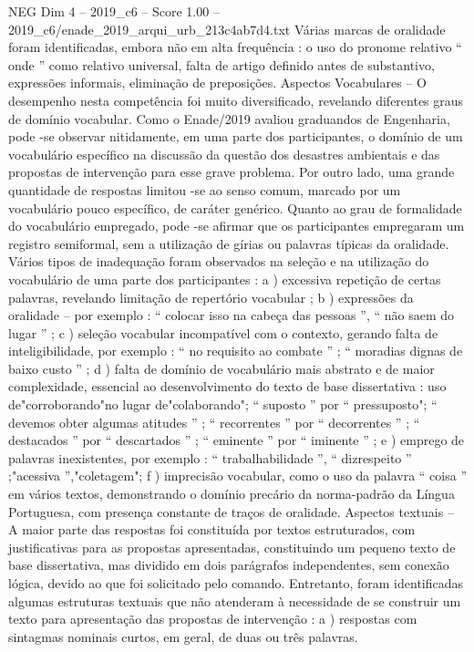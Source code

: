 \begin{textsample}{NEG Dim 4 – 2019\_c6 – Score 1.00 – 2019\_c6/enade\_2019\_arqui\_urb\_213c4ab7d4.txt}
Várias marcas de oralidade foram identificadas, embora não em alta frequência : o uso do pronome relativo “ onde ” como relativo universal, falta de artigo definido antes de substantivo, expressões informais, eliminação de preposições.
Aspectos Vocabulares – O desempenho nesta competência foi muito diversificado, revelando diferentes graus de domínio vocabular.
Como o Enade/2019 avaliou graduandos de Engenharia, pode -se observar nitidamente, em uma parte dos participantes, o domínio de um vocabulário específico na discussão da questão dos desastres ambientais e das propostas de intervenção para esse grave problema.
Por outro lado, uma grande quantidade de respostas limitou -se ao senso comum, marcado por um vocabulário pouco específico, de caráter genérico.
Quanto ao grau de formalidade do vocabulário empregado, pode -se afirmar que os participantes empregaram um registro semiformal, sem a utilização de gírias ou palavras típicas da oralidade.
Vários tipos de inadequação foram observados na seleção e na utilização do vocabulário de uma parte dos participantes : a ) excessiva repetição de certas palavras, revelando limitação de repertório vocabular ; b ) expressões da oralidade – por exemplo : “ colocar isso na cabeça das pessoas ”, “ não saem do lugar ” ; c ) seleção vocabular incompatível com o contexto, gerando falta de inteligibilidade, por exemplo : “ no requisito ao combate ” ; “ moradias dignas de baixo custo ” ; d ) falta de domínio de vocabulário mais abstrato e de maior complexidade, essencial ao desenvolvimento do texto de base dissertativa : uso de"corroborando"no lugar de"colaborando"; “ suposto ” por “ pressuposto"; “ devemos obter algumas atitudes ” ; “ recorrentes ” por “ decorrentes ” ; “ destacados ” por “ descartados ” ; “ eminente ” por “ iminente ” ; e ) emprego de palavras inexistentes, por exemplo : “ trabalhabilidade ”, “ dizrespeito ” ;"acessiva ”,"coletagem"; f ) imprecisão vocabular, como o uso da palavra “ coisa ” em vários textos, demonstrando o domínio precário da norma-padrão da Língua Portuguesa, com presença constante de traços de oralidade.
Aspectos textuais – A maior parte das respostas foi constituída por textos estruturados, com justificativas para as propostas apresentadas, constituindo um pequeno texto de base dissertativa, mas dividido em dois parágrafos independentes, sem conexão lógica, devido ao que foi solicitado pelo comando.
Entretanto, foram identificadas algumas estruturas textuais que não atenderam à necessidade de se construir um texto para apresentação das propostas de intervenção : a ) respostas com sintagmas nominais curtos, em geral, de duas ou três palavras.

\end{textsample}
